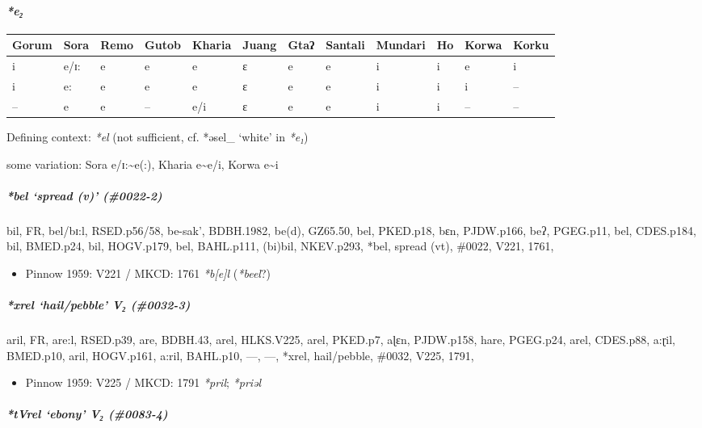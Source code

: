 \documentclass[a4paper,]{article}
\providecommand{\tightlist}{%
  \setlength{\itemsep}{0pt}\setlength{\parskip}{0pt}}
\let\oldparagraph\paragraph
\renewcommand{\paragraph}[1]{\oldparagraph{#1}\mbox{}}
\let\oldsubparagraph\subparagraph
\renewcommand{\subparagraph}[1]{\oldsubparagraph{#1}\mbox{}}
\begin{document}
\paragraph{\texorpdfstring{\emph{*e₂}}{*e₂}}\label{e-1}

\begin{longtable}[]{@{}llllllllllll@{}}
\toprule
Gorum & Sora & Remo & Gutob & Kharia & Juang & Gtaʔ & Santali & Mundari
& Ho & Korwa & Korku\tabularnewline
\midrule
\endhead
i & e/ɪ: & e & e & e & ɛ & e & e & i & i & e & i\tabularnewline
i & e: & e & e & e & ɛ & e & e & i & i & i & --\tabularnewline
-- & e & e & -- & e/i & ɛ & e & e & i & i & -- & --\tabularnewline
\bottomrule
\end{longtable}

Defining context: \emph{*el} (not sufficient, cf. *əsel\_ `white' in
\emph{*e₁})

some variation: Sora e/ɪ:\textasciitilde{}e(:), Kharia
e\textasciitilde{}e/i, Korwa e\textasciitilde{}i

\subparagraph{\texorpdfstring{\emph{*bel} `spread (v)'
(\#0022-2)}{*bel spread (v) (\#0022-2)}}\label{bel-spread-v-0022-2}

bil, FR, bel/bɪ:l, RSED.p56/58, be-sak', BDBH.1982, be(d), GZ65.50, bel,
PKED.p18, bɛn, PJDW.p166, beʔ, PGEG.p11, bel, CDES.p184, bil, BMED.p24,
bil, HOGV.p179, bel, BAHL.p111, (bi)bil, NKEV.p293, *bel, spread (vt),
\#0022, V221, 1761,

\begin{itemize}
\tightlist
\item
  Pinnow 1959: V221 / MKCD: 1761 \emph{*b{[}e{]}l} (\emph{*beel}?)
\end{itemize}

\subparagraph{\texorpdfstring{\emph{*xrel} `hail/pebble' V₂
(\#0032-3)}{*xrel hail/pebble V₂ (\#0032-3)}}\label{xrel-hailpebble-v-0032-3}

aril, FR, are:l, RSED.p39, are, BDBH.43, arel, HLKS.V225, arel, PKED.p7,
aɭɛn, PJDW.p158, hare, PGEG.p24, arel, CDES.p88, a:ɽil, BMED.p10, aril,
HOGV.p161, a:ril, BAHL.p10, ---, ---, *xrel, hail/pebble, \#0032, V225,
1791,

\begin{itemize}
\tightlist
\item
  Pinnow 1959: V225 / MKCD: 1791 \emph{*pril}; \emph{*priəl}
\end{itemize}

\subparagraph{\texorpdfstring{\emph{*tVrel} `ebony' V₂
(\#0083-4)}{*tVrel ebony V₂ (\#0083-4)}}\label{tvrel-ebony-v-0083-4}
\end{document}
